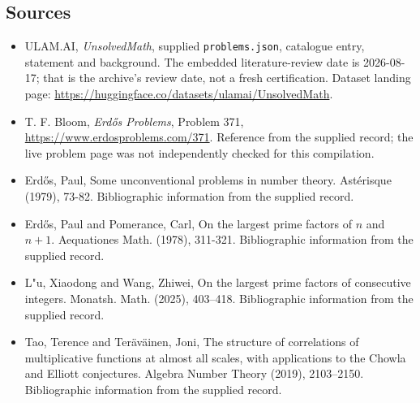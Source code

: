 \documentclass[11pt,a4paper]{article}
\begin{document}
\subsection{Sources}

{\small

\begin{itemize}

\item[\hypertarget{source:statement:1}{S1}] ULAM.AI, \emph{UnsolvedMath}, supplied \texttt{problems.json}, catalogue entry, statement and background. The embedded literature-review date is 2026-08-17; that is the archive’s review date, not a fresh certification. Dataset landing page: \url{https://huggingface.co/datasets/ulamai/UnsolvedMath}.

\item[\hypertarget{source:statement:2}{S2}] T. F. Bloom, \emph{Erdős Problems}, Problem 371, \url{https://www.erdosproblems.com/371}. Reference from the supplied record; the live problem page was not independently checked for this compilation.

\item[\hypertarget{source:statement:3}{S3}] Erd\H{o}s, Paul, Some unconventional problems in number theory. Ast\'{e}risque (1979), 73-82. Bibliographic information from the supplied record.

\item[\hypertarget{source:statement:4}{S4}] Erd\H{o}s, Paul and Pomerance, Carl, On the largest prime factors of {$n$} and {$n+1$}. Aequationes Math. (1978), 311-321. Bibliographic information from the supplied record.

\item[\hypertarget{source:statement:5}{S5}] L"u, Xiaodong and Wang, Zhiwei, On the largest prime factors of consecutive integers. Monatsh. Math. (2025), 403--418. Bibliographic information from the supplied record.

\item[\hypertarget{source:statement:6}{S6}] Tao, Terence and Ter\"{a}v\"{a}inen, Joni, The structure of correlations of multiplicative functions at almost all scales, with applications to the {C}howla and {E}lliott conjectures. Algebra Number Theory (2019), 2103--2150. Bibliographic information from the supplied record.

\end{itemize}

}

\label{end:statement}
\end{document}
